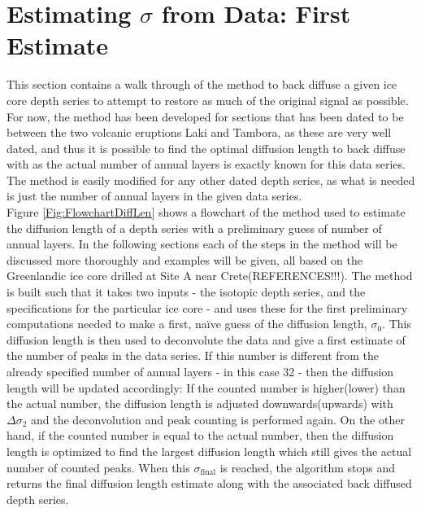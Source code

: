 \documentclass[../../CompleteThesis/Complete_1stDraft.tex]{subfiles}
\begin{document}
\section[First $\sigma$ estimate]{Estimating $\sigma$ from Data: First Estimate}
This section contains a walk through of the method to back diffuse a given ice core depth series to attempt to restore as much of the original signal as possible. For now, the method has been developed for sections that has been dated to be between the two volcanic eruptions Laki and Tambora, as these are very well dated, and thus it is possible to find the optimal diffusion length to back diffuse with as the actual number of annual layers is exactly known for this data series. The method is easily modified for any other dated depth series, as what is needed is just the number of annual layers in the given data series.\\
Figure \ref{Fig:FlowchartDiffLen} shows a flowchart of the method used to estimate the diffusion length of a depth series with a preliminary guess of number of annual layers. In the following sections each of the steps in the method will be discussed more thoroughly and examples will be given, all based on the Greenlandic ice core drilled at Site A near Crete(REFERENCES!!!).
The method is built such that it takes two inputs - the isotopic depth series, and the specifications for the particular ice core - and uses these for the first preliminary computations needed to make a first, naïve guess of the diffusion length, $\sigma_0$.
This diffusion length is then used to deconvolute the data and give a first estimate of the number of peaks in the data series. If this number is different from the already specified number of annual layers - in this case 32 - then the diffusion length will be updated accordingly: If the counted number is higher(lower) than the actual number, the diffusion length is adjusted downwards(upwards) with $\Delta\sigma_2$ and the deconvolution and peak counting is performed again.
On the other hand, if the counted number is equal to the actual number, then the diffusion length is optimized to find the largest diffusion length which still gives the actual number of counted peaks. When this $\sigma_{\text{final}}$ is reached, the algorithm stops and returns the final diffusion length estimate along with the associated back diffused depth series.
\end{document}
